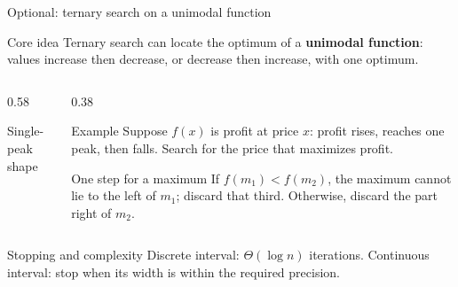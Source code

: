 \documentclass[aspectratio=169]{beamer}
\begin{document}
\begin{frame}{Optional: ternary search on a unimodal function}
  \scriptsize
  \begin{block}{Core idea}
    Ternary search can locate the optimum of a \textbf{unimodal function}:
    values increase then decrease, or decrease then increase, with one optimum.
  \end{block}
  \begin{columns}[T]
    \begin{column}{0.58\textwidth}
      \begin{exampleblock}{Single-peak shape}
      \begin{center}
      \end{center}
      \end{exampleblock}
    \end{column}
    \begin{column}{0.38\textwidth}
      \begin{exampleblock}{Example}
        Suppose $f(x)$ is profit at price $x$: profit rises, reaches one peak,
        then falls. Search for the price that maximizes profit.
      \end{exampleblock}
      \begin{alertblock}{One step for a maximum}
        If $f(m_1)<f(m_2)$, the maximum cannot lie to the left of $m_1$;
        discard that third. Otherwise, discard the part right of $m_2$.
      \end{alertblock}
    \end{column}
  \end{columns}
  \begin{block}{Stopping and complexity}
    Discrete interval: $\Theta(\log n)$ iterations. Continuous interval: stop
    when its width is within the required precision.
  \end{block}
\end{frame}
\end{document}
